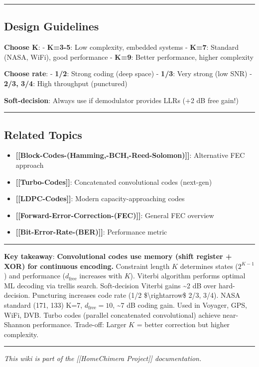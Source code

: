 \begin{center}\rule{0.5\linewidth}{0.5pt}\end{center}

\subsection{Design Guidelines}\label{design-guidelines}

\textbf{Choose K}: - \textbf{K=3-5}: Low complexity, embedded systems -
\textbf{K=7}: Standard (NASA, WiFi), good performance - \textbf{K=9}:
Better performance, higher complexity

\textbf{Choose rate}: - \textbf{1/2}: Strong coding (deep space) -
\textbf{1/3}: Very strong (low SNR) - \textbf{2/3, 3/4}: High throughput
(punctured)

\textbf{Soft-decision}: Always use if demodulator provides LLRs (+2 dB
free gain!)

\begin{center}\rule{0.5\linewidth}{0.5pt}\end{center}

\subsection{Related Topics}\label{related-topics}

\begin{itemize}
\tightlist
\item
  \textbf{{[}{[}Block-Codes-(Hamming,-BCH,-Reed-Solomon){]}{]}}:
  Alternative FEC approach
\item
  \textbf{{[}{[}Turbo-Codes{]}{]}}: Concatenated convolutional codes
  (next-gen)
\item
  \textbf{{[}{[}LDPC-Codes{]}{]}}: Modern capacity-approaching codes
\item
  \textbf{{[}{[}Forward-Error-Correction-(FEC){]}{]}}: General FEC
  overview
\item
  \textbf{{[}{[}Bit-Error-Rate-(BER){]}{]}}: Performance metric
\end{itemize}

\begin{center}\rule{0.5\linewidth}{0.5pt}\end{center}

\textbf{Key takeaway}: \textbf{Convolutional codes use memory (shift
register + XOR) for continuous encoding.} Constraint length \(K\)
determines states (\(2^{K-1}\)) and performance (\(d_{\text{free}}\)
increases with \(K\)). Viterbi algorithm performs optimal ML decoding
via trellis search. Soft-decision Viterbi gains \textasciitilde2 dB over
hard-decision. Puncturing increases code rate (1/2
\$\textbackslash rightarrow\$ 2/3, 3/4). NASA standard (171, 133) K=7,
\(d_{\text{free}}=10\), \textasciitilde7 dB coding gain. Used in
Voyager, GPS, WiFi, DVB. Turbo codes (parallel concatenated
convolutional) achieve near-Shannon performance. Trade-off: Larger \(K\)
= better correction but higher complexity.

\begin{center}\rule{0.5\linewidth}{0.5pt}\end{center}

\emph{This wiki is part of the {[}{[}Home\textbar Chimera Project{]}{]}
documentation.}
